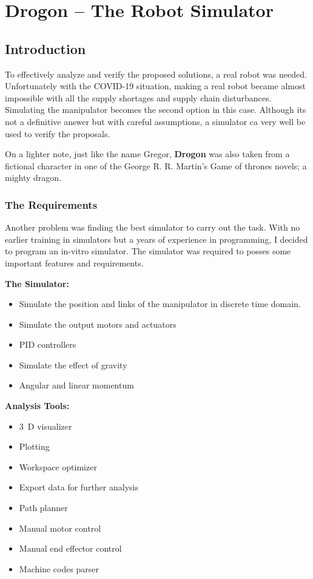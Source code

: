 \section{Drogon -- The Robot Simulator}
{
    \subsection{Introduction}
     
    To effectively analyze and verify the proposed solutions, a real robot was needed. Unfortunately with the COVID-19 situation, making a real robot became almost impossible with all the supply shortages and supply chain disturbances. Simulating the manipulator becomes the second option in this case. Although its not a definitive answer but with careful assumptions, a simulator ca very well be used to verify the proposals.

    On a lighter note, just like the name Gregor, \textbf{Drogon} was also taken from a fictional character in one of the George R. R. Martin's Game of thrones novels; a mighty dragon.

    \subsubsection{The Requirements}
    Another problem was finding the best simulator to carry out the task. With no earlier training in simulators but a years of experience in programming, I decided to program an in-vitro simulator. The simulator was required to posses some important features and requirements.

    \textbf{The Simulator:}
    \begin{itemize}
      \item Simulate the position and links of the manipulator in discrete time domain.
      \item Simulate the output motors and actuators
      \item PID controllers
      \item Simulate the effect of gravity
      \item Angular and linear momentum
    \end{itemize}

    \textbf{Analysis Tools:}
    \begin{itemize}
      \item $3$~D visualizer
      \item Plotting
      \item Workspace optimizer
      \item Export data for further analysis
      \item Path planner
      \item Manual motor control
      \item Manual end effector control
      \item Machine codes parser
    \end{itemize}

}
